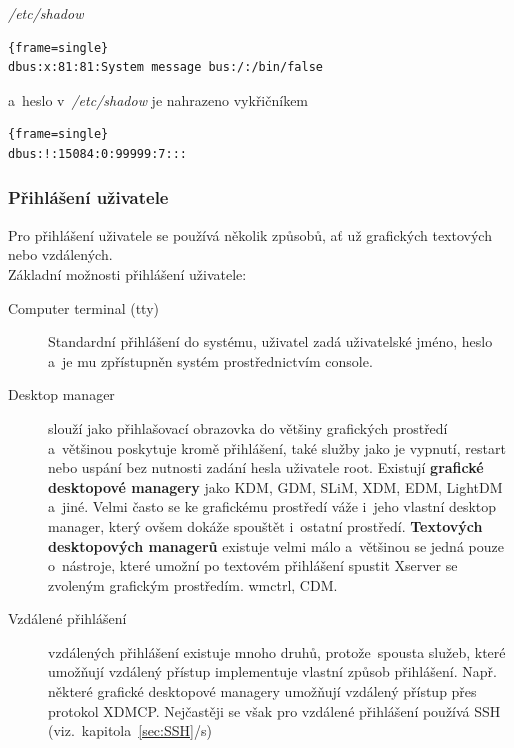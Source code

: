 \documentclass[a4paper,12pt]{article}
\newcommand{\odkazNaKapitolu}[1]{(viz.~kapitola~\ref{#1}/s\pageref{#1})}
\newenvironment{codeframe}{%
  \begin{Sbox} 
    \begin{minipage} 
      {\columnwidth-\leftmargin-\rightmargin-2\fboxsep-2\fboxrule-4pt} 
}{%

  \end{minipage} 
  \end{Sbox} 
  \begin{center} 
    \fcolorbox{black}{codeback}{\TheSbox} 
  \end{center} 
}
\begin{document}
\begin{description}
\textit{/etc/shadow}
    \begin{codeframe}
      \begin{Verbatim}{frame=single}
dbus:x:81:81:System message bus:/:/bin/false
\end{Verbatim} 
    \end{codeframe}
a~heslo v~\textit{/etc/shadow} je nahrazeno vykřičníkem
    \begin{codeframe}
      \begin{Verbatim}{frame=single}
dbus:!:15084:0:99999:7:::
\end{Verbatim} 
    \end{codeframe}

 \end{description}

\subsubsection{Přihlášení uživatele}
Pro přihlášení uživatele se používá několik způsobů, ať už grafických textových nebo vzdálených.\\

Základní možnosti přihlášení uživatele:
\begin{description}
 \item[Computer terminal (tty)] Standardní přihlášení do systému, uživatel zadá uživatelské jméno, heslo a~je mu zpřístupněn systém prostřednictvím console.
 \item[Desktop manager] slouží jako přihlašovací obrazovka do většiny grafických prostředí a~většinou poskytuje kromě přihlášení, také služby jako je vypnutí, restart nebo uspání bez nutnosti zadání hesla uživatele root. Existují \textbf{grafické desktopové managery} jako KDM, GDM, SLiM, XDM, EDM, LightDM a~jiné. Velmi často se ke grafickému prostředí váže i~jeho vlastní desktop manager, který ovšem dokáže spouštět i~ostatní prostředí. \textbf{Textových desktopových managerů} existuje velmi málo a~většinou se jedná pouze o~nástroje, které umožní po textovém přihlášení spustit Xserver se zvoleným grafickým prostředím. wmctrl, CDM.
 \item[Vzdálené přihlášení] vzdálených přihlášení existuje mnoho druhů, protože~spousta služeb, které umožňují vzdálený přístup implementuje vlastní způsob přihlášení. Např. některé grafické desktopové managery umožňují vzdálený přístup přes protokol XDMCP. Nejčastěji se však pro vzdálené přihlášení používá SSH \odkazNaKapitolu{sec:SSH}
\end{description}
\end{document}
